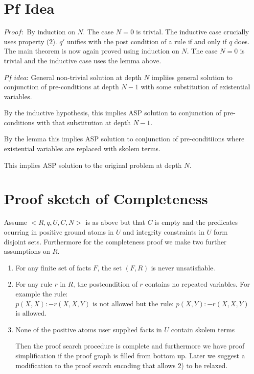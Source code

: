 \documentclass[sigconf]{acmart}
\begin{document}
\section{Pf Idea}

$Proof:$ By induction on $N$. The case $N=0$ is trivial. The inductive case crucially uses property (2). $q'$ unifies with the post condition of a rule if and only if $q$ does.
The main theorem is now again proved using induction on $N$. The case $N=0$ is trivial and the inductive case uses the lemma above.

$Pf$ $idea$: General non-trivial solution at depth $N$ impliies general solution to conjunction of pre-conditions at depth $N-1$ with some substitution of existential variables.

By the inductive hypothesis, this implies ASP solution to conjunction of pre-conditions with that substitution at depth $N-1$.

By the lemma this implies ASP solution to conjunction of pre-conditiions where existential variables are replaced with skolem terms. 

This implies ASP solution to the original problem at depth $N$.


\section{Proof sketch of Completeness}

Assume $<R,q,U,C,N>$ is as above but that $C$ is empty and the predicates ocurring in positive ground atoms in $U$ and integrity constraints in $U$ form disjoint sets. Furthermore for the completeness proof we make two further assumptions on $R$.

\begin{enumerate}
\item For any finite set of facts $F$, the set $(F,R)$ is never unsatisfiable.

\item For any rule $r$ in $R$, the postcondition of $r$ contains no repeated variables. For example the rule:\\
$p(X,X):-r(X,X,Y)$ is not allowed but the rule: $p(X,Y):-r(X,X,Y)$ is allowed.

\item None of the positive atoms user supplied facts in $U$ contain skolem terms

Then the proof search procedure is complete and furthermore we have proof simplification if the proof graph is filled from bottom up. Later we suggest a modification to the proof search encoding that allows 2) to be relaxed.
\end{enumerate}
\end{document}
